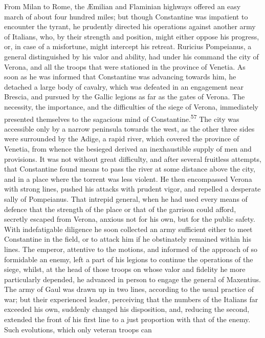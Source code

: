 From Milan to Rome, the Æmilian and Flaminian highways offered an
easy march of about four hundred miles; but though Constantine
was impatient to encounter the tyrant, he prudently directed his
operations against another army of Italians, who, by their
strength and position, might either oppose his progress, or, in
case of a misfortune, might intercept his retreat. Ruricius
Pompeianus, a general distinguished by his valor and ability, had
under his command the city of Verona, and all the troops that
were stationed in the province of Venetia. As soon as he was
informed that Constantine was advancing towards him, he detached
a large body of cavalry, which was defeated in an engagement near
Brescia, and pursued by the Gallic legions as far as the gates of
Verona. The necessity, the importance, and the difficulties of
the siege of Verona, immediately presented themselves to the
sagacious mind of Constantine.\textsuperscript{57} The city was accessible only by
a narrow peninsula towards the west, as the other three sides
were surrounded by the Adige, a rapid river, which covered the
province of Venetia, from whence the besieged derived an
inexhaustible supply of men and provisions. It was not without
great difficulty, and after several fruitless attempts, that
Constantine found means to pass the river at some distance above
the city, and in a place where the torrent was less violent. He
then encompassed Verona with strong lines, pushed his attacks
with prudent vigor, and repelled a desperate sally of Pompeianus.
That intrepid general, when he had used every means of defence
that the strength of the place or that of the garrison could
afford, secretly escaped from Verona, anxious not for his own,
but for the public safety. With indefatigable diligence he soon
collected an army sufficient either to meet Constantine in the
field, or to attack him if he obstinately remained within his
lines. The emperor, attentive to the motions, and informed of the
approach of so formidable an enemy, left a part of his legions to
continue the operations of the siege, whilst, at the head of
those troops on whose valor and fidelity he more particularly
depended, he advanced in person to engage the general of
Maxentius. The army of Gaul was drawn up in two lines, according
to the usual practice of war; but their experienced leader,
perceiving that the numbers of the Italians far exceeded his own,
suddenly changed his disposition, and, reducing the second,
extended the front of his first line to a just proportion with
that of the enemy. Such evolutions, which only veteran troops can
